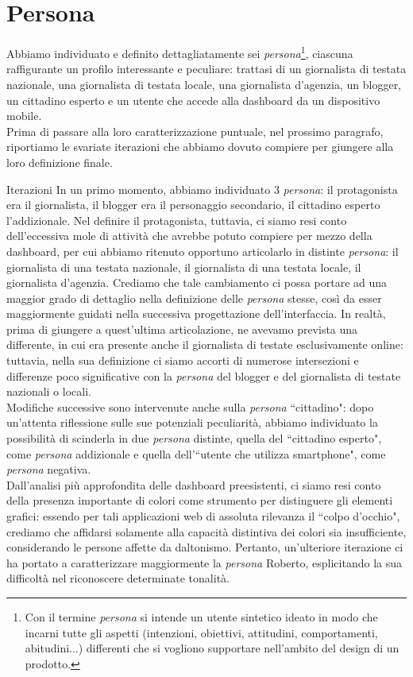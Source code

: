 \section{Persona}
\label{s:persona}
Abbiamo individuato e definito dettagliatamente sei \textit{persona}\footnote{Con il termine \textit{persona} si intende un utente sintetico ideato in modo che incarni tutte gli aspetti (intenzioni, obiettivi, attitudini, comportamenti, abitudini...) differenti che si vogliono supportare nell'ambito del design di un prodotto.}, ciascuna raffigurante un profilo interessante e peculiare: trattasi di un giornalista di testata nazionale, una giornalista di testata locale, una giornalista d'agenzia, un blogger, un cittadino esperto e un utente che accede alla dashboard da un dispositivo mobile.\\
Prima di passare alla loro caratterizzazione puntuale, nel prossimo paragrafo, riportiamo le svariate iterazioni che abbiamo dovuto compiere per giungere alla loro definizione finale.

\begin{bclogo}{Iterazioni}
    In un primo momento, abbiamo individuato 3 \textit{persona}: il protagonista era il giornalista, il blogger era il personaggio secondario, il cittadino esperto l'addizionale. Nel definire il protagonista, tuttavia, ci siamo resi conto dell'eccessiva mole di attività che avrebbe potuto compiere per mezzo della dashboard, per cui abbiamo ritenuto opportuno articolarlo in distinte \textit{persona}: il giornalista di una testata nazionale, il giornalista di una testata locale, il giornalista d'agenzia. Crediamo che tale cambiamento ci possa portare ad una maggior grado di dettaglio nella definizione delle \textit{persona} stesse, così da esser maggiormente guidati nella successiva progettazione dell'interfaccia.
    \noindent
    In realtà, prima di giungere a quest'ultima articolazione, ne avevamo prevista una differente, in cui era presente anche il giornalista di testate esclusivamente online: tuttavia, nella sua definizione ci siamo accorti di numerose intersezioni e differenze poco significative con la \textit{persona} del blogger e del giornalista di testate nazionali o locali. \\ 
    Modifiche successive sono intervenute anche sulla \textit{persona} ``cittadino": dopo un'attenta riflessione sulle sue potenziali peculiarità, abbiamo individuato la possibilità di scinderla in due \textit{persona} distinte, quella del ``cittadino esperto", come \textit{persona} addizionale e quella dell'``utente che utilizza smartphone", come \textit{persona} negativa.\\
    Dall'analisi più approfondita delle dashboard preesistenti, ci siamo resi conto della presenza importante di colori come strumento per distinguere gli elementi grafici: essendo per tali applicazioni web di assoluta rilevanza il ``colpo d'occhio", crediamo che affidarsi solamente alla capacità distintiva dei colori sia insufficiente, considerando le persone affette da daltonismo. Pertanto, un'ulteriore iterazione ci ha portato a caratterizzare maggiormente la \textit{persona} Roberto, esplicitando la sua difficoltà nel riconoscere determinate tonalità.
\end{bclogo}    


